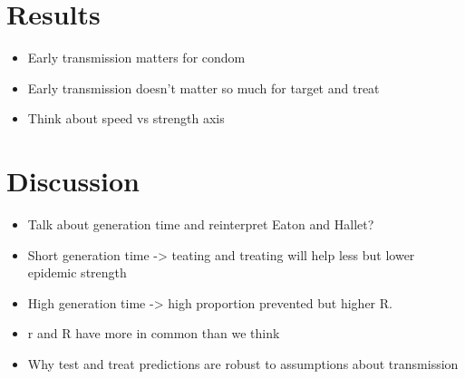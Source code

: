 \documentclass{article}\usepackage[]{graphicx}\usepackage[]{color}
\begin{document}
\section{Results}

\begin{itemize}
	\item Early transmission matters for condom
	\item Early transmission doesn't matter so much for target and treat
	\item Think about speed vs strength axis
\end{itemize}

\section{Discussion}


\begin{itemize}
	\item Talk about generation time and reinterpret Eaton and Hallet?
	\item Short generation time -> teating and treating will help less but lower epidemic strength
	\item High generation time -> high proportion prevented but higher R.
\end{itemize}

\begin{itemize}
	\item r and R have more in common than we think
	\item Why test and treat predictions are robust to assumptions about transmission
\end{itemize}
\end{document}
